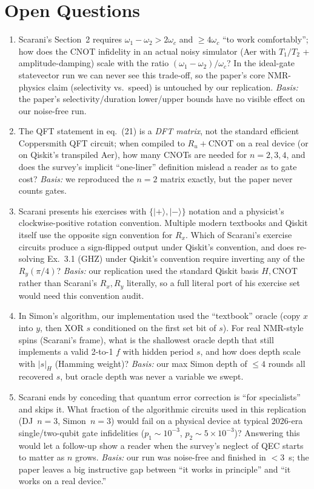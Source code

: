 \documentclass[11pt]{article}
\begin{document}
\section{Open Questions}
\begin{enumerate}
    \item[\textbf{Q1}] Scarani's Section~2 requires $\omega_1 - \omega_2 > 2\omega_c$ and $\ge 4\omega_c$ ``to work comfortably''; how does the CNOT infidelity in an actual noisy simulator (Aer with $T_1/T_2$ + amplitude-damping) scale with the ratio $(\omega_1-\omega_2)/\omega_c$?  In the ideal-gate statevector run we can never see this trade-off, so the paper's core NMR-physics claim (selectivity vs.\ speed) is untouched by our replication.  \emph{Basis:} the paper's selectivity/duration lower/upper bounds have no visible effect on our noise-free run.
    \item[\textbf{Q2}] The QFT statement in eq.~(21) is a \emph{DFT matrix}, not the standard efficient Coppersmith QFT circuit; when compiled to $R_u+\text{CNOT}$ on a real device (or on Qiskit's transpiled Aer), how many CNOTs are needed for $n=2,3,4$, and does the survey's implicit ``one-liner'' definition mislead a reader as to gate cost?  \emph{Basis:} we reproduced the $n{=}2$ matrix exactly, but the paper never counts gates.
    \item[\textbf{Q3}] Scarani presents his exercises with $\{|+\rangle,|-\rangle\}$ notation and a physicist's clockwise-positive rotation convention.  Multiple modern textbooks and Qiskit itself use the opposite sign convention for $R_x$.  Which of Scarani's exercise circuits produce a sign-flipped output under Qiskit's convention, and does re-solving Ex.\ 3.1 (GHZ) under Qiskit's convention require inverting any of the $R_y(\pi/4)$?  \emph{Basis:} our replication used the standard Qiskit basis $H,\text{CNOT}$ rather than Scarani's $R_x,R_y$ literally, so a full literal port of his exercise set would need this convention audit.
    \item[\textbf{Q4}] In Simon's algorithm, our implementation used the ``textbook'' oracle (copy $x$ into $y$, then XOR $s$ conditioned on the first set bit of $s$).  For real NMR-style spins (Scarani's frame), what is the shallowest oracle depth that still implements a valid 2-to-1 $f$ with hidden period $s$, and how does depth scale with $|s|_H$ (Hamming weight)?  \emph{Basis:} our max Simon depth of $\le 4$ rounds all recovered $s$, but oracle depth was never a variable we swept.
    \item[\textbf{Q5}] Scarani ends by conceding that quantum error correction is ``for specialists'' and skips it.  What fraction of the algorithmic circuits used in this replication (DJ~$n{=}3$, Simon~$n{=}3$) would fail on a physical device at typical 2026-era single/two-qubit gate infidelities ($p_1{\sim}10^{-3}$, $p_2{\sim}5\!\times\!10^{-3}$)?  Answering this would let a follow-up show a reader when the survey's neglect of QEC starts to matter as $n$ grows.  \emph{Basis:} our run was noise-free and finished in $<3$~s; the paper leaves a big instructive gap between ``it works in principle'' and ``it works on a real device.''
\end{enumerate}
\end{document}
